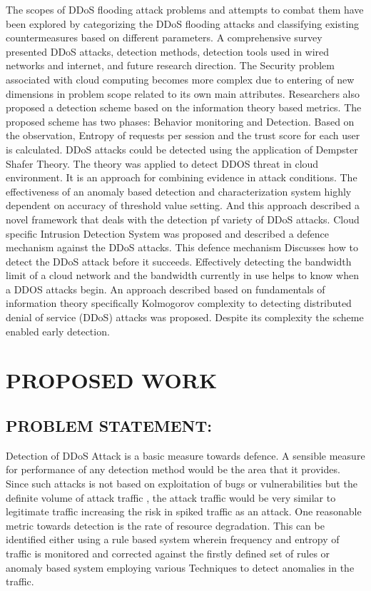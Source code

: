 \documentclass[letterpaper, 10 pt, conference]{ieeeconf}  %
\begin{document}
The scopes of DDoS flooding attack problems and attempts to combat them have been explored by categorizing the DDoS flooding attacks and classifying existing countermeasures based on different parameters. A comprehensive survey presented DDoS attacks, detection methods, detection tools used in wired networks and internet, and future research direction. The Security problem associated with cloud computing becomes more complex due to entering of new dimensions in problem scope related to its own main attributes. Researchers also proposed a detection scheme based on the information theory based metrics. The proposed scheme has two phases: Behavior monitoring and Detection. Based on the observation, Entropy of requests per session and the trust score for each user is calculated. DDoS attacks could be detected using the application of Dempster Shafer Theory. The theory was applied to detect DDOS threat in cloud environment. It is an approach for combining evidence in attack conditions. The effectiveness of an anomaly based detection and characterization system highly dependent on accuracy of threshold value setting. And this approach described a novel framework that deals with the detection pf variety of DDoS attacks. Cloud specific Intrusion Detection System was proposed and described a defence mechanism against the DDoS attacks. This defence mechanism Discusses how to detect the DDoS attack before it succeeds. Effectively detecting the bandwidth limit of a cloud network and the bandwidth currently in use helps to know when a DDOS attacks begin. An approach described based on fundamentals of information theory specifically Kolmogorov complexity to detecting distributed denial of service (DDoS) attacks was proposed. Despite its complexity the scheme enabled early detection.


\section{PROPOSED WORK}

\subsection{PROBLEM STATEMENT:}
Detection of DDoS Attack is a basic measure towards defence. A sensible measure for performance of any detection method would be the area that it provides. Since such attacks is not based on exploitation of bugs or vulnerabilities but the definite volume of attack traffic , the attack traffic would be very similar to legitimate traffic  increasing the risk in spiked traffic as an attack. One reasonable metric towards detection is the rate of resource degradation. This can be identified either using a rule based system wherein frequency and entropy of traffic is monitored and corrected against the firstly defined set of rules or anomaly based system employing various Techniques to detect anomalies in the traffic.
\end{document}
